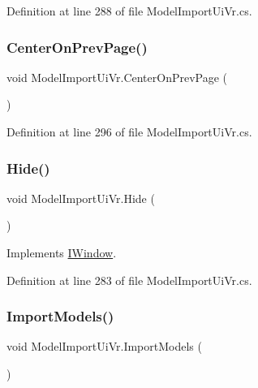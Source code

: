 Definition at line 288 of file Model\+Import\+Ui\+Vr.\+cs.

\mbox{\label{class_model_import_ui_vr_a9aee36657340e839eae154bf9c4fdd22}} 
\subsubsection{\texorpdfstring{CenterOnPrevPage()}{CenterOnPrevPage()}}
{\footnotesize\ttfamily void Model\+Import\+Ui\+Vr.\+Center\+On\+Prev\+Page (\begin{DoxyParamCaption}{ }\end{DoxyParamCaption})}



Definition at line 296 of file Model\+Import\+Ui\+Vr.\+cs.

\mbox{\label{class_model_import_ui_vr_a20b68a74daa479ca9582518531871b77}} 
\subsubsection{\texorpdfstring{Hide()}{Hide()}}
{\footnotesize\ttfamily void Model\+Import\+Ui\+Vr.\+Hide (\begin{DoxyParamCaption}{ }\end{DoxyParamCaption})}



Implements \mbox{\hyperlink{interface_i_window_a829d3aa9bcf80a75ba84968399492378}{I\+Window}}.



Definition at line 283 of file Model\+Import\+Ui\+Vr.\+cs.

\mbox{\label{class_model_import_ui_vr_a9a755198e4567dc72ee904c92f6df3ad}} 
\subsubsection{\texorpdfstring{ImportModels()}{ImportModels()}}
{\footnotesize\ttfamily void Model\+Import\+Ui\+Vr.\+Import\+Models (\begin{DoxyParamCaption}{ }\end{DoxyParamCaption})}



